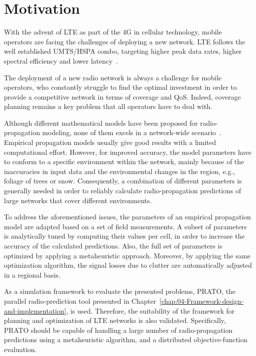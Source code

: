 \section{Motivation \label{sec:05-Motivation}}

With the advent of LTE as part of the 4G in cellular technology, mobile
operators are facing the challenges of deploying a new network. LTE
follows the well established UMTS/HSPA combo, targeting higher peak
data rates, higher spectral efficiency and lower latency~\cite{Song_Evolved_cellular_network_planning_and_optimization_for_UMTS_and_LTE:2010}. 

The deployment of a new radio network is always a challenge for mobile
operators, who constantly struggle to find the optimal investment
in order to provide a competitive network in terms of coverage and
QoS. Indeed, coverage planning remains a key problem that all operators
have to deal with.

Although different mathematical models have been proposed for radio-propagation
modeling, none of them excels in a network-wide scenario~\cite{Shabbir_Comparison_of_radio_propagation_models:2011}.
Empirical propagation models usually give good results with a limited
computational effort. However, for improved accuracy, the model parameters
have to conform to a specific environment within the network, mainly
because of the inaccuracies in input data and the environmental changes
in the region, e.g., foliage of trees or snow. Consequently, a combination
of different parameters is generally needed in order to reliably calculate
radio-propagation predictions of large networks that cover different
environments.

To address the aforementioned issues, the parameters of an empirical
propagation model are adapted based on a set of field measurements.
A subset of parameters is analytically tuned by computing their values
per cell, in order to increase the accuracy of the calculated predictions.
Also, the full set of parameters is optimized by applying a metaheuristic
approach. Moreover, by applying the same optimization algorithm, the
signal losses due to clutter are automatically adjusted in a regional
basis.

As a simulation framework to evaluate the presented problems, PRATO,
the parallel radio-prediction tool presented in Chapter~\ref{chap:04-Framework-design-and-implementation},
is used. Therefore, the suitability of the framework for planning
and optimization of LTE networks is also validated. Specifically,
PRATO should be capable of handling a large number of radio-propagation
predictions using a metaheuristic algorithm, and a distributed objective-function
evaluation.


